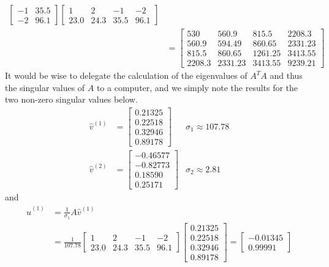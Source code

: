 \begin{solution}
\begin{align*}
\begin{bmatrix}
-1 & 35.5 \\
-2 & 96.1    
\end{bmatrix}
\begin{bmatrix}
1 & 2 & -1 & -2 \\
23.0 & 24.3 & 35.5 & 96.1    
\end{bmatrix} \\
&=
\begin{bmatrix}
530&560.9&815.5&2208.3\\ 
560.9&594.49&860.65&2331.23\\ 
815.5&860.65&1261.25&3413.55\\ 
2208.3&2331.23&3413.55&9239.21
\end{bmatrix}
\end{align*}
It would be wise to delegate the calculation of the eigenvalues of $A^TA$ and thus the singular values of $A$ to a computer, and we simply note the results for the two non-zero singular values below.
\begin{align*}
\hat{v}^{(1)} &= 
\begin{bmatrix}
0.21325 \\
0.22518 \\  
0.32946 \\
0.89178
\end{bmatrix}
& \sigma_1 \approx 107.78 \\
\hat{v}^{(2)} &= 
\begin{bmatrix}
-0.46577 \\
-0.82773 \\
0.18590 \\
0.25171
\end{bmatrix}
& \sigma_2 \approx 2.81 
\end{align*}
and
\begin{align*}
\hat{u}^{(1)} &= \frac{1}{\sigma_1} A\hat{v}^{(1)} \\
&= \frac{1}{107.78} \begin{bmatrix}
1 & 2 & -1 & -2 \\
23.0 & 24.3 & 35.5 & 96.1    
\end{bmatrix}
\begin{bmatrix}
0.21325 \\
0.22518 \\  
0.32946 \\
0.89178
\end{bmatrix} = 
\begin{bmatrix}
-0.01345 \\
0.99991
\end{bmatrix} \\

\end{align*}
\end{solution}
